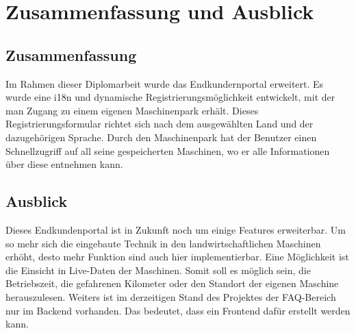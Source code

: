 \chapter{Zusammenfassung und Ausblick}
\section{Zusammenfassung}
Im Rahmen dieser Diplomarbeit wurde das Endkundernportal erweitert. Es wurde eine i18n und dynamische Registrierungsmöglichkeit entwickelt, mit der man Zugang zu einem eigenen Maschinenpark erhält. Dieses Registrierungsformular richtet sich nach dem ausgewählten Land und der dazugehörigen Sprache. Durch den Maschinenpark hat der Benutzer einen Schnellzugriff auf all seine gespeicherten Maschinen, wo er alle Informationen über diese entnehmen kann.
\section{Ausblick}
Dieses Endkundenportal ist in Zukunft noch um einige Features erweiterbar. Um so mehr sich die eingebaute Technik in den landwirtschaftlichen Maschinen erhöht, desto mehr Funktion sind auch hier implementierbar. Eine Möglichkeit ist die Einsicht in Live-Daten der Maschinen. Somit soll es möglich sein, die Betriebszeit, die gefahrenen Kilometer oder den Standort der eigenen Maschine herauszulesen. Weiters ist im derzeitigen Stand des Projektes der FAQ-Bereich nur im Backend vorhanden. Das bedeutet, dass ein Frontend dafür erstellt werden kann.